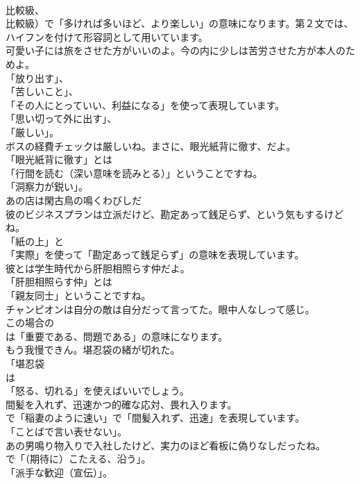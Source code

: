 \documentclass[8pt]{extreport}
\begin{document}
\begin{CJK}{UTF8}{min}
\\	比較級、
\\	比較級）で「多ければ多いほど、より楽しい」の意味になります。第２文では、ハイフンを付けて形容詞として用いています。	
\\	可愛い子には旅をさせた方がいいのよ。今の内に少しは苦労させた方が本人のためよ。 
\\	「放り出す」、
\\	「苦しいこと」、
\\	「その人にとっていい、利益になる」を使って表現しています。
\\	「思い切って外に出す」、
\\	「厳しい」。	
\\	ボスの経費チェックは厳しいね。まさに、眼光紙背に徹す、だよ。 
\\	「眼光紙背に徹す」とは
\\	「行間を読む（深い意味を読みとる）」ということですね。
\\	「洞察力が鋭い」。	
\\	あの店は閑古鳥の鳴くわびしだ 
\\	彼のビジネスプランは立派だけど、勘定あって銭足らず、という気もするけどね。 
\\	「紙の上」と
\\	「実際」を使って「勘定あって銭足らず」の意味を表現しています。	
\\	彼とは学生時代から肝胆相照らす仲だよ。 
\\	「肝胆相照らす仲」とは
\\	「親友同士」ということですね。	
\\	チャンピオンは自分の敵は自分だって言ってた。眼中人なしって感じ。 
\\	この場合の
\\	は「重要である、問題である」の意味になります。	
\\	もう我慢できん。堪忍袋の緒が切れた。 
\\	「堪忍袋 
\\	は
\\	「怒る、切れる」を使えばいいでしょう。	
\\	間髪を入れず、迅速かつ的確な応対、畏れ入ります。 
\\	で「稲妻のように速い」で「間髪入れず、迅速」を表現しています。
\\	「ことばで言い表せない」。	
\\	あの男鳴り物入りで入社したけど、実力のほど看板に偽りなしだったね。 
\\	で「（期待に）こたえる、沿う」。
\\	「派手な歓迎（宣伝）」。	

\end{CJK}
\end{document}
